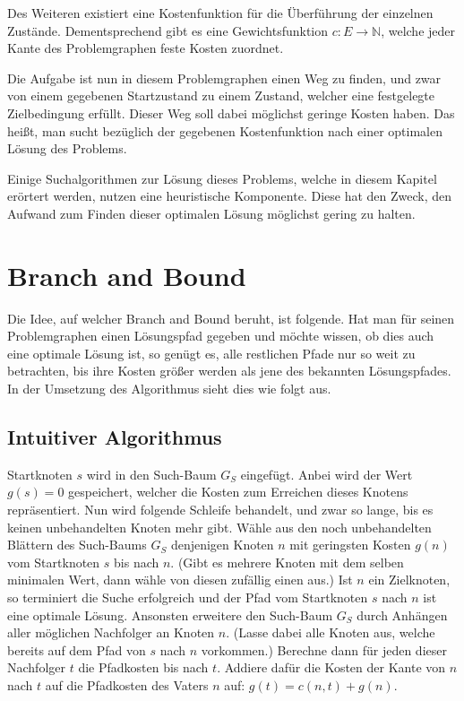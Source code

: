 Des Weiteren existiert eine Kostenfunktion für die Überführung der einzelnen Zustände. Dementsprechend gibt es eine Gewichtsfunktion $c:E\to \mathbb{N}$, welche jeder Kante des Problemgraphen feste Kosten zuordnet.

Die Aufgabe ist nun in diesem Problemgraphen einen Weg zu finden, und zwar von einem gegebenen Startzustand zu einem Zustand, welcher eine festgelegte Zielbedingung erfüllt.
Dieser Weg soll dabei möglichst geringe Kosten haben. Das heißt, man sucht bezüglich der gegebenen Kostenfunktion nach einer optimalen Lösung des Problems.

Einige Suchalgorithmen zur Lösung dieses Problems, welche in diesem Kapitel erörtert werden, nutzen eine heuristische Komponente.
Diese hat den Zweck, den Aufwand zum Finden dieser optimalen Lösung möglichst gering zu halten.




\section{Branch and Bound}

Die Idee, auf welcher Branch and Bound beruht, ist folgende. Hat man für seinen Problemgraphen einen Lösungspfad gegeben und möchte wissen, ob dies auch eine optimale Lösung ist, so genügt es, alle restlichen Pfade nur so weit zu betrachten, bis ihre Kosten größer werden als jene des bekannten Lösungspfades.
In der Umsetzung des Algorithmus sieht dies wie folgt aus.

\subsection{Intuitiver Algorithmus}

Startknoten $s$ wird in den Such-Baum $G_{S}$ eingefügt. Anbei wird der Wert $g(s)=0$ gespeichert, welcher die Kosten zum Erreichen dieses Knotens repräsentiert.
Nun wird folgende Schleife behandelt, und zwar so lange, bis es keinen unbehandelten Knoten mehr gibt.
Wähle aus den noch unbehandelten Blättern des Such-Baums $G_{S}$ denjenigen Knoten $n$ mit geringsten Kosten $g(n)$ vom Startknoten $s$ bis nach $n$. (Gibt es mehrere Knoten mit dem selben minimalen Wert, dann wähle von diesen zufällig einen aus.)
Ist $n$ ein Zielknoten, so terminiert die Suche erfolgreich und der Pfad vom Startknoten $s$ nach $n$ ist eine optimale Lösung.
Ansonsten erweitere den Such-Baum $G_{S}$ durch Anhängen aller möglichen Nachfolger an Knoten $n$. (Lasse dabei alle Knoten aus, welche bereits auf dem Pfad von $s$ nach $n$ vorkommen.) Berechne dann für jeden dieser Nachfolger $t$ die Pfadkosten bis nach $t$. Addiere dafür die Kosten der Kante von $n$ nach $t$ auf die Pfadkosten des Vaters $n$ auf: $g(t)=c({n,t})+g(n)$.

